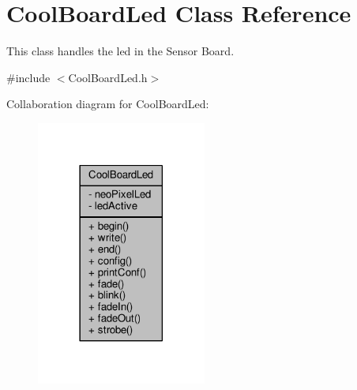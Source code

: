 \hypertarget{classCoolBoardLed}{}\section{Cool\+Board\+Led Class Reference}
\label{classCoolBoardLed}


This class handles the led in the Sensor Board.  




{\ttfamily \#include $<$Cool\+Board\+Led.\+h$>$}



Collaboration diagram for Cool\+Board\+Led\+:\nopagebreak
\begin{figure}[H]
\begin{center}
\leavevmode
\includegraphics[width=158pt]{classCoolBoardLed__coll__graph}
\end{center}
\end{figure}
